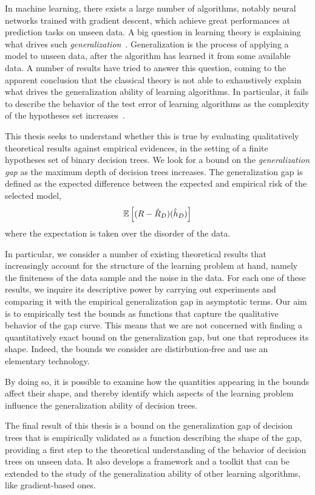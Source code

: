 In machine learning, there exists a large number of algorithms, notably neural networks trained with gradient descent, which achieve great performances at prediction tasks on unseen data.
A big question in learning theory is explaining what drives such {\it generalization\/}~\cite{zhang2016understanding,neyshabur2014search}.  
Generalization is the process of applying a model to unseen data, after the algorithm has learned it from some available data.
A number of results have tried to answer this question, coming to the apparent conclusion that the classical theory is not able to exhaustively explain what drives the generalization ability of learning algorithms. In particular, it fails to describe the behavior of the test error of learning algorithms as the complexity of the hypotheses set increases~\cite{belkin2019reconciling,zhang2016understanding,zhang2021understanding, nagarajan2019uniform}.

This thesis seeks to understand whether this is true by evaluating qualitatively theoretical results against empirical evidences, in the setting of a finite hypotheses set of binary decision trees. We look for a bound on the {\it generalization gap\/} as the maximum depth of decision trees increases. The generalization gap is defined as the expected difference between the expected and empirical risk of the selected model, 
\[
\mathbb{E}\left[(R-\hat R_D)(\hat h_D)\right]
\]
where the expectation is taken over the disorder of the data. 

In particular, we consider a number of existing theoretical results that increasingly account for the structure of the learning problem at hand, namely the finiteness of the data sample and the noise in the data. For each one of these results, we inquire its descriptive power by carrying out experiments and comparing it with the empirical generalization gap in asymptotic terms. Our aim is to empirically test the bounds as functions that capture the qualitative behavior of the gap curve. This means that we are not concerned with finding a quantitatively exact bound on the generalization gap, but one that reproduces its shape. Indeed, the bounds we consider are distirbution-free and use an elementary technology. 

By doing so, it is possible to examine how the quantities appearing in the bounds affect their shape, and thereby identify which aspects of the learning problem influence the generalization ability of decision trees. 

The final result of this thesis is a bound on the generalization gap of decision trees that is empirically validated as a function describing the shape of the gap, providing a first step to the theoretical understanding of the behavior of decision trees on unseen data. It also develops a framework and a toolkit that can be extended to the study of the generalization ability of other learning algorithms, like gradient-based ones.

